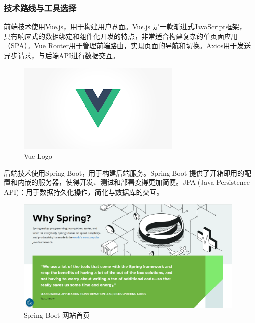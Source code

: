 \documentclass{base}
\begin{document}
\subsubsection{技术路线与工具选择}


前端技术使用Vue.js，用于构建用户界面。Vue.js 是一款渐进式JavaScript框架，具有响应式的数据绑定和组件化开发的特点，非常适合构建复杂的单页面应用（SPA）。Vue Router用于管理前端路由，实现页面的导航和切换。Axios用于发送异步请求，与后端API进行数据交互。

\begin{figure}[H]
	\centering
	\includegraphics[width=\linewidth]{images/vue-logo.png}
	\caption{Vue Logo}
	\label{fig:}
\end{figure}

后端技术使用Spring Boot，用于构建后端服务。Spring Boot 提供了开箱即用的配置和内嵌的服务器，使得开发、测试和部署变得更加简便。JPA (Java Persistence API)：用于数据持久化操作，简化与数据库的交互。

\begin{figure}[H]
	\centering
	\includegraphics[width=\linewidth]{images/spring-web.png}
	\caption{Spring Boot 网站首页}
	\label{fig:}
\end{figure}
\end{document}
